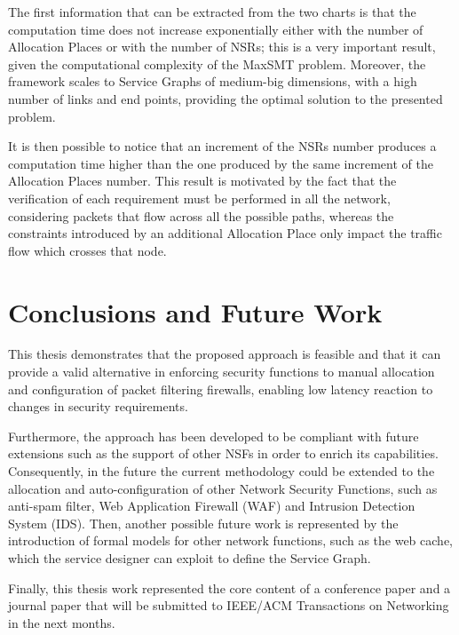 \documentclass[10pt,a4paper,roman, twocolumn]{article}
\begin{document}
The first information that can be extracted from the two charts is that the computation time does not increase exponentially either with the number of Allocation Places or with the number of NSRs; this is a very important result, given the computational complexity of the MaxSMT problem. Moreover, the framework scales to Service Graphs of medium-big dimensions, with a high number of links and end points, providing the optimal solution to the presented problem.

It is then possible to notice that an increment of the NSRs number produces a computation time higher than the one produced by the same increment of the Allocation Places number. This result is motivated by the fact that the verification of each requirement must be performed in all the network, considering packets that flow across all the possible paths, whereas the constraints introduced by an additional Allocation Place only impact the traffic flow which crosses that node.

\section{Conclusions and Future Work}
	 
This thesis demonstrates that the proposed approach is feasible and that it can provide a valid alternative in enforcing security functions to manual allocation and configuration of packet filtering firewalls, enabling low latency reaction to changes in security requirements. 

Furthermore, the approach has been developed to be compliant with future extensions such as the support of other NSFs in order to enrich its capabilities. Consequently, in the future the current methodology could be extended to the allocation and auto-configuration of other Network Security Functions, such as anti-spam filter, Web Application Firewall (WAF) and Intrusion Detection System (IDS). %
Then, another possible future work is represented by the introduction of formal models for other network functions, such as the web cache, which the service designer can exploit to define the Service Graph.


Finally, this thesis work represented the core content of a conference paper and a journal paper that will be submitted to IEEE/ACM Transactions on Networking in the next months.
	 
\end{document}
